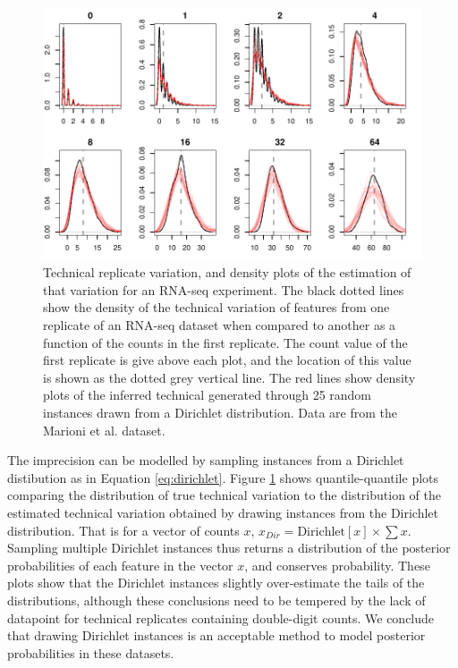 \documentclass[article]{ajs}\usepackage[]{graphicx}\usepackage[]{color}
\makeatletter
\def\maxwidth{ %
  \ifdim\Gin@nat@width>\linewidth
    \linewidth
  \else
    \Gin@nat@width
  \fi
}
\newenvironment{knitrout}{}{} %
\makeatother
\begin{document}
\begin{figure}[!ht]
\begin{center}
\begin{knitrout}
\color{fgcolor}
\includegraphics[width=\maxwidth]{figure/unnamed-chunk-1-1} 

\end{knitrout}
\caption{Technical replicate variation, and density plots of the estimation of that variation for an RNA-seq experiment. The black dotted lines show the density of the technical variation of features from one replicate of an RNA-seq dataset when compared to another as a function of the counts in the first replicate. The  count value of the first replicate  is give above each plot, and the location of this value is shown as the dotted grey vertical line. The red lines show density plots  of the inferred technical generated through 25 random instances drawn from  a Dirichlet distribution. Data are from the Marioni et al. \citeyear{Marioni:2008} dataset.}
\label{fig:qq}
\end{center}
\end{figure}

The imprecision can be modelled by sampling instances from a Dirichlet distibution  \citep{fernandes:2013,fernandes:2014} as in Equation \ref{eq:dirichlet}. Figure \ref{fig:qq} shows quantile-quantile plots comparing the distribution of true technical variation to the distribution of the estimated technical variation obtained  by drawing instances from the Dirichlet distribution. That is for a vector of counts $x$, $x_{Dir} = \mathrm{Dirichlet}[x] \times \sum x$. Sampling multiple Dirichlet instances thus returns a distribution of the posterior probabilities of each feature in the vector $x$, and conserves probability. These plots show that  the Dirichlet instances slightly over-estimate the tails of the distributions, although these conclusions need to be tempered by the lack of datapoint for technical replicates containing double-digit counts. We conclude that drawing Dirichlet instances is an acceptable method to model posterior probabilities in these datasets. 
\end{document}
